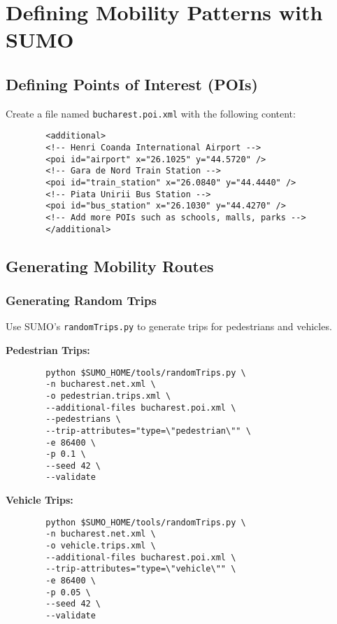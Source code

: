 \documentclass{article}
\begin{document}
	\section{Defining Mobility Patterns with SUMO}
	
	\subsection{Defining Points of Interest (POIs)}
	
	Create a file named \texttt{bucharest.poi.xml} with the following content:
	
	\begin{verbatim}
		<additional>
		<!-- Henri Coanda International Airport -->
		<poi id="airport" x="26.1025" y="44.5720" />
		<!-- Gara de Nord Train Station -->
		<poi id="train_station" x="26.0840" y="44.4440" />
		<!-- Piata Unirii Bus Station -->
		<poi id="bus_station" x="26.1030" y="44.4270" />
		<!-- Add more POIs such as schools, malls, parks -->
		</additional>
	\end{verbatim}
	
	\subsection{Generating Mobility Routes}
	
	\subsubsection{Generating Random Trips}
	
	Use SUMO's \texttt{randomTrips.py} to generate trips for pedestrians and vehicles.
	
	\textbf{Pedestrian Trips:}
	
	\begin{verbatim}
		python $SUMO_HOME/tools/randomTrips.py \
		-n bucharest.net.xml \
		-o pedestrian.trips.xml \
		--additional-files bucharest.poi.xml \
		--pedestrians \
		--trip-attributes="type=\"pedestrian\"" \
		-e 86400 \
		-p 0.1 \
		--seed 42 \
		--validate
	\end{verbatim}
	
	\textbf{Vehicle Trips:}
	
	\begin{verbatim}
		python $SUMO_HOME/tools/randomTrips.py \
		-n bucharest.net.xml \
		-o vehicle.trips.xml \
		--additional-files bucharest.poi.xml \
		--trip-attributes="type=\"vehicle\"" \
		-e 86400 \
		-p 0.05 \
		--seed 42 \
		--validate
	\end{verbatim}
	
\end{document}
